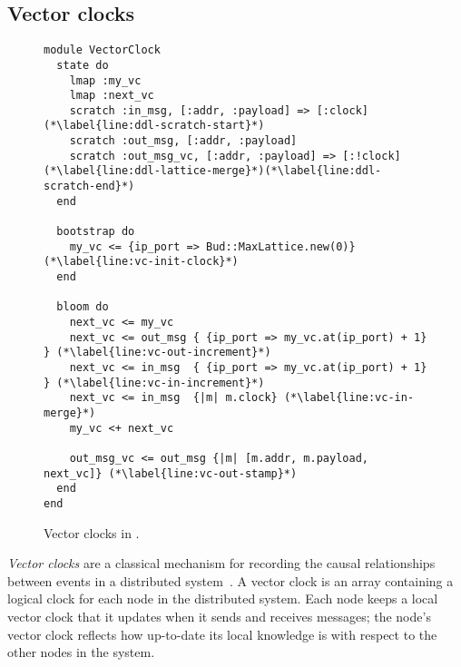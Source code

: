 
\subsection{Vector clocks}
\begin{figure}[t]
\begin{scriptsize}
\begin{lstlisting}
module VectorClock
  state do
    lmap :my_vc
    lmap :next_vc
    scratch :in_msg, [:addr, :payload] => [:clock] (*\label{line:ddl-scratch-start}*)
    scratch :out_msg, [:addr, :payload]
    scratch :out_msg_vc, [:addr, :payload] => [:!clock] (*\label{line:ddl-lattice-merge}*)(*\label{line:ddl-scratch-end}*)
  end

  bootstrap do
    my_vc <= {ip_port => Bud::MaxLattice.new(0)} (*\label{line:vc-init-clock}*)
  end

  bloom do
    next_vc <= my_vc
    next_vc <= out_msg { {ip_port => my_vc.at(ip_port) + 1} } (*\label{line:vc-out-increment}*)
    next_vc <= in_msg  { {ip_port => my_vc.at(ip_port) + 1} } (*\label{line:vc-in-increment}*)
    next_vc <= in_msg  {|m| m.clock} (*\label{line:vc-in-merge}*)
    my_vc <+ next_vc

    out_msg_vc <= out_msg {|m| [m.addr, m.payload, next_vc]} (*\label{line:vc-out-stamp}*)
  end
end
\end{lstlisting}
\end{scriptsize}
\caption{Vector clocks in \lang.}
\label{fig:vector-clock-src}
\end{figure}

\emph{Vector clocks} are a classical mechanism for recording the causal
relationships between events in a distributed
system~\cite{Fidge1988,Mattern1989}.  A vector clock is an array containing a
logical clock for each node in the distributed system. Each node keeps a local
vector clock that it updates when it sends and receives messages; the node's
vector clock reflects how up-to-date its local knowledge is with respect to the
other nodes in the system.

